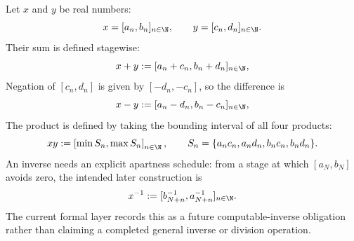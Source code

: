 \begin{definition}\label{def:raw-real-arithmetic}
{\footnotesize\raggedright
{}\par
{}\par
{}\par}
Let \(x\) and \(y\) be real numbers:
\[
  x=[a_n,b_n]_{n\in\N},\qquad y=[c_n,d_n]_{n\in\N}.
\]
Their sum is defined stagewise:
\[
  x+y := [a_n+c_n,b_n+d_n]_{n\in\N},
\]
Negation of \([c_n,d_n]\) is given by \([-d_n,-c_n]\), so the difference is
\[
  x-y := [a_n-d_n,b_n-c_n]_{n\in\N},
\]
The product is defined by taking the bounding interval of all four
products:
\[
  xy:=
  \left[
    \min S_n,\max S_n
  \right]_{n\in\N},
  \qquad
  S_n=\{a_nc_n,a_nd_n,b_nc_n,b_nd_n\}.
\]
An inverse needs an explicit apartness schedule: from a stage at which
\([a_N,b_N]\) avoids zero, the intended later construction is
\[
  x^{-1}:= [ b_{N+n}^{-1}, a_{N+n}^{-1} ]_{n\in\N}.
\]
The current formal layer records this as a future computable-inverse
obligation rather than claiming a completed general inverse or division
operation.
\end{definition}



